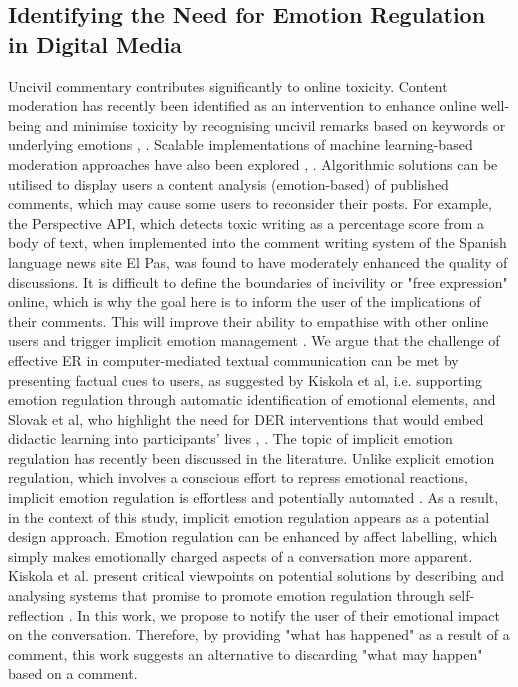 \subsection{Identifying the Need for Emotion Regulation in Digital Media}
Uncivil commentary contributes significantly to online toxicity. Content moderation has recently been identified as an intervention to enhance online well-being and minimise toxicity by recognising uncivil remarks based on keywords or underlying emotions \cite{thomas2022s}, \cite{jhaver2021evaluating}. Scalable implementations of machine learning-based moderation approaches have also been explored \cite{gorwa2020algorithmic}, \cite{gillespie2020content}. Algorithmic solutions can be utilised to display users a content analysis (emotion-based) of published comments, which may cause some users to reconsider their posts. For example, the Perspective API, which detects toxic writing as a percentage score from a body of text, when implemented into the comment writing system of the Spanish language news site El Pas, was found to have moderately enhanced the quality of discussions. It is difficult to define the boundaries of incivility or "free expression" online, which is why the goal here is to inform the user of the implications of their comments. This will improve their ability to empathise with other online users and trigger implicit emotion management \cite{walther1993impression}. We argue that the challenge of effective ER in computer-mediated textual communication can be met by presenting factual cues to users, as suggested by Kiskola et al, i.e. supporting emotion regulation through automatic identification of emotional elements, and Slovak et al, who highlight the need for DER interventions that would embed didactic learning into participants' lives \cite{kiskola2021applying}, \cite{slovak2022designing}.  The topic of implicit emotion regulation has recently been discussed in the literature. Unlike explicit emotion regulation, which involves a conscious effort to repress emotional reactions, implicit emotion regulation is effortless and potentially automated \cite{torre2018putting}. As a result, in the context of this study, implicit emotion regulation appears as a potential design approach. Emotion regulation can be enhanced by affect labelling, which simply makes emotionally charged aspects of a conversation more apparent. Kiskola et al. present critical viewpoints on potential solutions by describing and analysing systems that promise to promote emotion regulation through self-reflection \cite{kiskola2021applying}. In this work, we propose to notify the user of their emotional impact on the conversation. Therefore, by providing "what has happened" as a result of a comment, this work suggests an alternative to discarding "what may happen" based on a comment.

